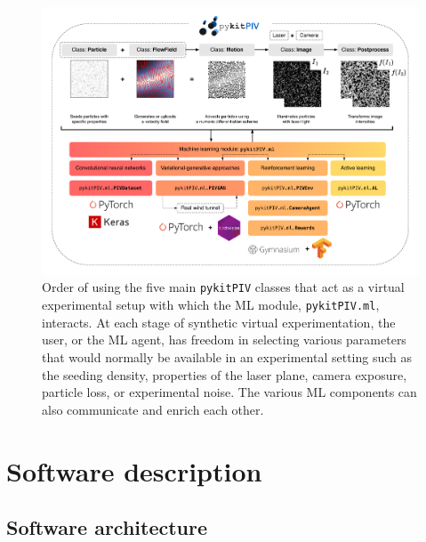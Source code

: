 \documentclass[a4paper,fleqn]{cas-dc}
\begin{document}
\begin{figure}[t]
\centering
\vspace{-0.4 in}
\includegraphics[width=\textwidth]{pykitPIV-modules.pdf}
\vspace{10 pt}
\caption{\footnotesize Order of using the five main \texttt{pykitPIV} classes that act as a virtual experimental setup with which the ML module, \texttt{pykitPIV.ml}, interacts. At each stage of synthetic virtual experimentation, the user, or the ML agent, has freedom in selecting various parameters that would normally be available in an experimental setting such as the seeding density, properties of the laser plane, camera exposure, particle loss, or experimental noise. The various ML components can also communicate and enrich each other.}
\label{fig:pykitPIV-overview}
\end{figure}

\section{Software description} \label{sec:software}





\subsection{Software architecture}
\end{document}
